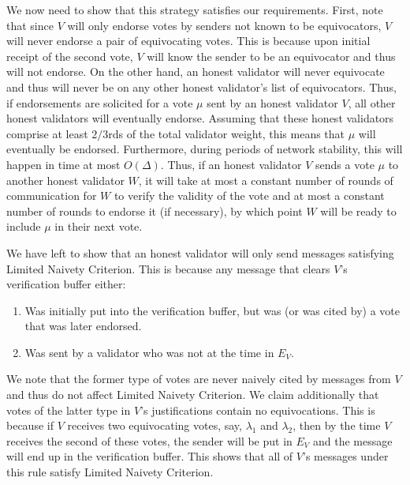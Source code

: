 \documentclass[12pt, fleqn]{article}
\begin{document}
We now need to show that this strategy satisfies our requirements. First, note that since $V$ will only endorse votes by senders not known to be equivocators, $V$ will never endorse a pair of equivocating votes. This is because upon initial receipt of the second vote, $V$ will know the sender to be an equivocator and thus will not endorse. On the other hand, an honest validator will never equivocate and thus will never be on any other honest validator's list of equivocators. Thus, if endorsements are solicited for a vote $\mu$ sent by an honest validator $V$, all other honest validators will eventually endorse. Assuming that these honest validators comprise at least $2/3$rds of the total validator weight, this means that $\mu$ will eventually be endorsed. Furthermore, during periods of network stability, this will happen in time at most $O(\Delta)$. Thus, if an honest validator $V$ sends a vote $\mu$ to another honest validator $W$, it will take at most a constant number of rounds of communication for $W$ to verify the validity of the vote and at most a constant number of rounds to endorse it (if necessary), by which point $W$ will be ready to include $\mu$ in their next vote.

We have left to show that an honest validator will only send messages satisfying Limited Naivety Criterion. This is because any message that clears $V$'s verification buffer either:
\begin{enumerate}
\item Was initially put into the verification buffer, but was (or was cited by) a vote that was later endorsed.
\item Was sent by a validator who was not at the time in $E_V$.
\end{enumerate}
We note that the former type of votes are never naively cited by messages from $V$ and thus do not affect Limited Naivety Criterion. We claim additionally that votes of the latter type in $V$'s justifications contain no equivocations. This is because if $V$ receives two equivocating votes, say, $\lambda_1$ and $\lambda_2$, then by the time $V$ receives the second of these votes, the sender will be put in $E_V$ and the message will end up in the verification buffer. This shows that all of $V$'s messages under this rule satisfy Limited Naivety Criterion.


\end{document}
